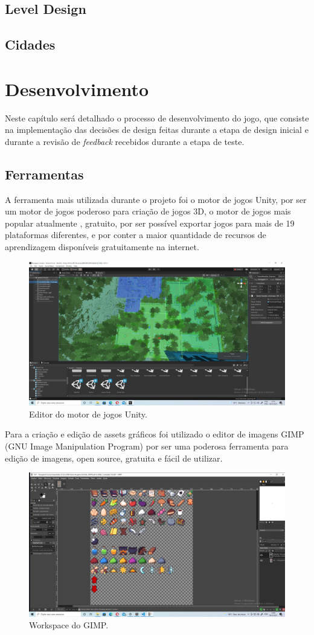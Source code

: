 \documentclass[
	12pt,				%
	openright,			%
	twoside,			%
	a4paper,			%
	english,			%
	french,				%
	spanish,			%
	brazil				%
	]{abntex2}
\begin{document}
\section{Level Design}
\section{Cidades}

\chapter{Desenvolvimento}

Neste capítulo será detalhado o processo de desenvolvimento do jogo, que consiste na implementação das decisões de design feitas durante a etapa de design inicial e durante a revisão de \emph{feedback} recebidos durante a etapa de teste.

\section{Ferramentas}

A ferramenta mais utilizada durante o projeto foi o motor de jogos Unity, por ser um motor de jogos poderoso para criação de jogos 3D, o motor de jogos mais popular atualmente \cite{GameDev:2021}, gratuito, por ser possível exportar jogos para mais de 19 plataformas diferentes, e por conter a maior quantidade de recursos de aprendizagem disponíveis gratuitamente na internet.

\begin{figure}[h!]
 \centering
  \includegraphics[width=0.65\linewidth]{unityeditor.jpg}
  \caption{Editor do motor de jogos Unity.}
  \label{fig:editor}
\end{figure}

Para a criação e edição de assets gráficos foi utilizado o editor de imagens GIMP (GNU Image Manipulation Program) por ser uma poderosa ferramenta para edição de imagens, open source, gratuita e fácil de utilizar.

\begin{figure}[h!]
 \centering
  \includegraphics[width=0.65\linewidth]{gimp.jpg}
  \caption{Workspace do GIMP.}
  \label{fig:gimp}
\end{figure}
\end{document}
